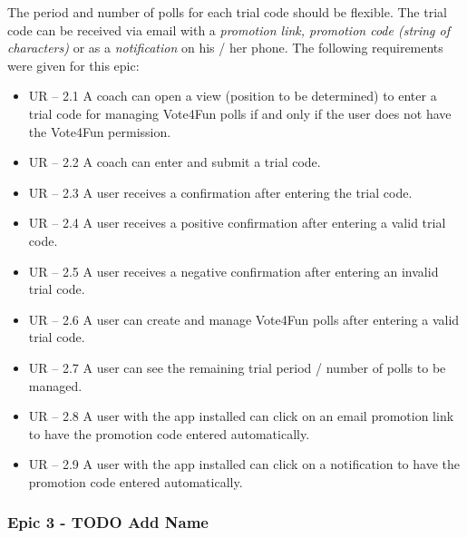 The period and number of polls for each trial code should be flexible. 
\newline
The trial code can be received via email with a \textit{promotion link, promotion code (string of characters)} or as a \textit{notification} on his /  her phone. 
\newline
The following requirements were given for this epic:

\begin{itemize}
    \item UR – 2.1 
    \newline
    A coach can open a view (position to be determined) to enter a trial code for managing Vote4Fun polls if and only if the user does not have the Vote4Fun permission.
    \item UR – 2.2
    \newline
    A coach can enter and submit a trial code.
    \item UR – 2.3 
    \newline
    A user receives a confirmation after entering the trial code.
    \item UR – 2.4 
    \newline
    A user receives a positive confirmation after entering a valid trial code.
    \item UR – 2.5 
    \newline
    A user receives a negative confirmation after entering an invalid trial code.
    \item UR – 2.6
    \newline
    A user can create and manage Vote4Fun polls after entering a valid trial code.
    \item UR – 2.7 
    \newline
    A user can see the remaining trial period / number of polls to be managed.
    \item UR – 2.8
    \newline
    A user with the app installed can click on an email promotion link to have the promotion code entered automatically.
    \item UR – 2.9 
    \newline
    A user with the app installed can click on a notification to have the promotion code entered automatically.
\end{itemize}

\subsubsection{Epic 3 - TODO Add Name}
\label{sssec:epic3}

